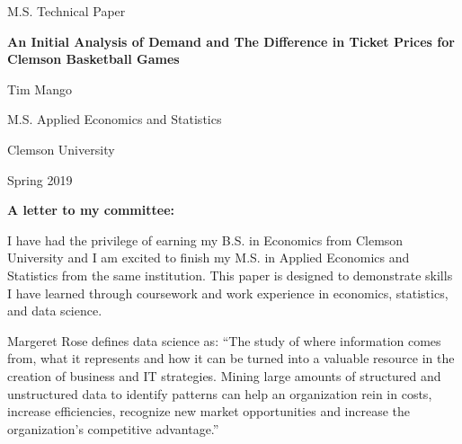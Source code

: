 \documentclass[preprint,12pt,times]{elsarticle}
\begin{document}
\begin{center}
\vspace*{5cm}

        \begin{Large}
        {M.S. Technical Paper}
        \end{Large}
        
        \vspace{1cm}
        \begin{LARGE}
        \textbf{An Initial Analysis of Demand and The Difference in Ticket Prices for Clemson Basketball Games}
        \end{LARGE}
        
        \vspace{10cm}
        \begin{Large}
        Tim Mango
        \end{Large}
        
        \begin{Large}
        M.S. Applied Economics and Statistics
        \end{Large}
        
        \begin{Large}
        Clemson University
        \end{Large}
        \vspace{0.1cm}
        
        \begin{Large}
        Spring 2019
        \end{Large}
        \vfill
\end{center}

\newpage

\begin{large}
\noindent\textbf{A letter to my committee:}
\end{large}

I have had the privilege of earning my B.S. in Economics from Clemson University and I am excited to finish my M.S. in Applied Economics and Statistics from the same institution.  This paper is designed to demonstrate skills I have learned through coursework and work experience in economics, statistics, and data science.

Margeret Rose defines data science as: “The study of where information comes from, what it represents and how it can be turned into a valuable resource in the creation of business and IT strategies. Mining large amounts of structured and unstructured data to identify patterns can help an organization rein in costs, increase efficiencies, recognize new market opportunities and increase the organization's competitive advantage.”
\end{document}
